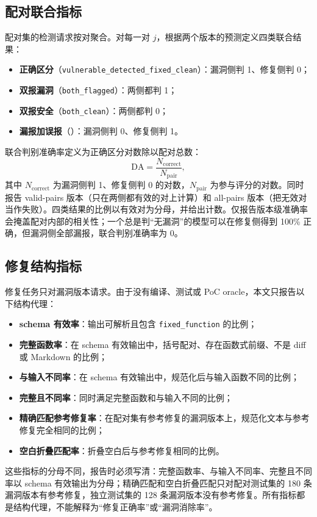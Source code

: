 \documentclass[conference]{IEEEtran}
\begin{document}
\subsection{配对联合指标}
配对集的检测请求按对聚合。对每一对 $j$，根据两个版本的预测定义四类联合结果：
\begin{itemize}
    \item \textbf{正确区分}（\texttt{vulnerable\_detected\_fixed\_clean}）：漏洞侧判 1、修复侧判 0；
    \item \textbf{双报漏洞}（\texttt{both\_flagged}）：两侧都判 1；
    \item \textbf{双报安全}（\texttt{both\_clean}）：两侧都判 0；
    \item \textbf{漏报加误报}（）：漏洞侧判 0、修复侧判 1。
\end{itemize}
联合判别准确率定义为正确区分对数除以配对总数：
\begin{equation}
\mathrm{DA}=\frac{N_{\mathrm{correct}}}{N_{\mathrm{pair}}},
\end{equation}
其中 $N_{\mathrm{correct}}$ 为漏洞侧判 1、修复侧判 0 的对数，$N_{\mathrm{pair}}$ 为参与评分的对数。同时报告 valid-pairs 版本（只在两侧都有效的对上计算）和 all-pairs 版本（把无效对当作失败）。四类结果的比例以有效对为分母，并给出计数。仅报告版本级准确率会掩盖配对内部的相关性；一个总是判“无漏洞”的模型可以在修复侧得到 100\% 正确，但漏洞侧全部漏报，联合判别准确率为 0。

\subsection{修复结构指标}
修复任务只对漏洞版本请求。由于没有编译、测试或 PoC oracle，本文只报告以下结构代理：
\begin{itemize}
    \item \textbf{schema 有效率}：输出可解析且包含 \texttt{fixed\_function} 的比例；
    \item \textbf{完整函数率}：在 schema 有效输出中，括号配对、存在函数式前缀、不是 diff 或 Markdown 的比例；
    \item \textbf{与输入不同率}：在 schema 有效输出中，规范化后与输入函数不同的比例；
    \item \textbf{完整且不同率}：同时满足完整函数和与输入不同的比例；
    \item \textbf{精确匹配参考修复率}：在配对集有参考修复的漏洞版本上，规范化文本与参考修复完全相同的比例；
    \item \textbf{空白折叠匹配率}：折叠空白后与参考修复相同的比例。
\end{itemize}
这些指标的分母不同，报告时必须写清：完整函数率、与输入不同率、完整且不同率以 schema 有效输出为分母；精确匹配和空白折叠匹配只对配对测试集的 180 条漏洞版本有参考修复，独立测试集的 128 条漏洞版本没有参考修复。所有指标都是结构代理，不能解释为“修复正确率”或“漏洞消除率”。
\end{document}
